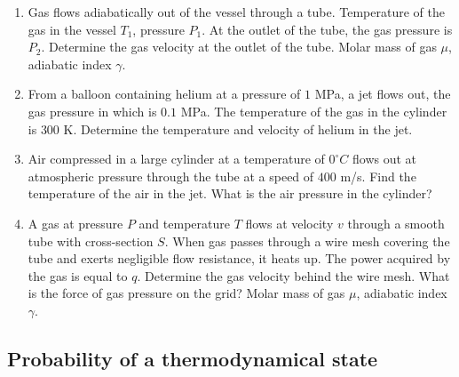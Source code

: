 \documentclass{article}
\begin{document}
\begin{enumerate}[label=5.7.\arabic*]
\item Gas flows adiabatically out of the vessel through a tube. Temperature of the gas in the vessel $T_1$, pressure $P_1$. At the outlet of the tube, the gas pressure is $P_2$. Determine the gas velocity at the outlet of the tube. Molar mass of gas $\mu$, adiabatic index $\gamma$.

\item From a balloon containing helium at a pressure of $1$ MPa, a jet flows out, the gas pressure in which is $0.1$ MPa. The temperature of the gas in the cylinder is $300$ K. Determine the temperature and velocity of helium in the jet.

\item Air compressed in a large cylinder at a temperature of $0^\circ C$ flows out at atmospheric pressure through the tube at a speed of $400$ m/s. Find the temperature of the air in the jet. What is the air pressure in the cylinder?

\item A gas at pressure $P$ and temperature $T$ flows at velocity $v$ through a smooth tube with cross-section $S$. When gas passes through a wire mesh covering the tube and exerts negligible flow resistance, it heats up. The power acquired by the gas is equal to $q$. Determine the gas velocity behind the wire mesh. What is the force of gas pressure on the grid? Molar mass of gas $\mu$, adiabatic index $\gamma$.





\end{enumerate}

\subsection{Probability of a thermodynamical state}
\end{document}
